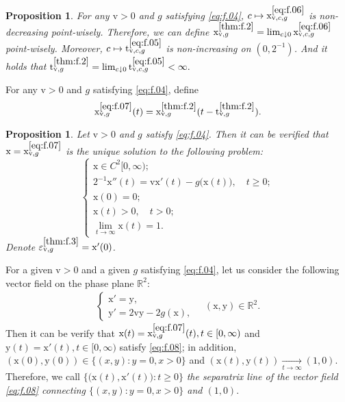 \documentclass[12pt,a4paper]{amsart}
\numberwithin{equation}{section}
\theoremstyle{plain}
\newtheorem{proposition}[theorem]{Proposition}
\theoremstyle{remark}
\begin{document}
\begin{proposition} \label{thm:f.2}
	For any $\mathrm v>0$ and $g$ satisfying \eqref{eq:f.04}, $c \mapsto \mathrm x_{\mathrm v, c,g}^{\eqref{eq:f.06}}$ is non-decreasing point-wisely.
	Therefore, we can define
	$
	\mathrm x_{\mathrm v,g}^{\ref{thm:f.2}} = \lim_{c\downarrow 0} \mathrm x_{\mathrm v,c,g}^{\eqref{eq:f.06}}
	$
	point-wisely.
	Moreover, $c\mapsto \mathrm t_{\mathrm v, c, g}^{\eqref{eq:f.05}}$ is non-increasing on $(0,2^{-1})$.
	And it holds that
	$
	\mathrm t^{\ref{thm:f.2}}_{\mathrm v, g} = \lim_{c\downarrow 0} \mathrm t_{\mathrm v, c , g}^{\eqref{eq:f.05}} < \infty.
	$
\end{proposition}

For any $\mathrm v>0$ and $g$ satisfying \eqref{eq:f.04}, define 
\begin{equation} \label{eq:f.07}
\mathrm x_{\mathrm v, g}^{\eqref{eq:f.07}}(t) = \mathrm x_{\mathrm v, g}^{\ref{thm:f.2}}(t - \mathrm t_{\mathrm v,g}^{\ref{thm:f.2}}).
\end{equation}
\begin{proposition} \label{thm:f.3}
	Let $\mathrm v>0$ and $g$ satisfy \eqref{eq:f.04}. 
	Then it can be verified that $\mathrm x = \mathrm x_{\mathrm v,g}^{\eqref{eq:f.07}}$ is the unique solution to the following problem:
	\begin{equation}
	\begin{cases}
	\mathrm x \in C^2[0,\infty);
	\\ 2^{-1} \mathrm x''(t) = \mathrm v \mathrm x'(t) - g\big(\mathrm x(t)\big), \quad t \geq 0;
	\\ \mathrm x(0) = 0;
	\\ \mathrm x(t) > 0, \quad t > 0;
	\\ \lim_{t\to \infty}\mathrm x(t) = 1.
	\end{cases}
	\end{equation}
	Denote $\varepsilon_{\mathrm v, g}^{\ref{thm:f.3}} = \mathrm x'(0)$.
\end{proposition}

For a given $\mathrm v>0$ and a given $g$ satisfying \eqref{eq:f.04}, let us consider the following vector field on the phase plane $\mathbb R^2$: 
\begin{align} \label{eq:f.08}
\begin{cases}
\mathrm x' = \mathrm y,
\\ \mathrm y' = 2\mathrm v \mathrm y - 2g(\mathrm x),
\end{cases}
\quad (\mathrm x, \mathrm y) \in \mathbb R^2.
\end{align}
Then it can be verify that $\mathrm x(t) = \mathrm x_{\mathrm v, g}^{\ref{eq:f.07}}(t), t \in [0,\infty)$ and $\mathrm y(t) = \mathrm x'(t), t \in [0,\infty)$ satisfy \eqref{eq:f.08}; in addition, $(\mathrm x(0), \mathrm y(0)) \in \{(x,y): y = 0, x>0\}$ and $(\mathrm x(t), \mathrm y(t)) \xrightarrow[t\to \infty]{}(1,0)$. 
Therefore, we call 
$
\big\{\big(\mathrm x (t), \mathrm x'(t)\big): t\geq 0 \big\}
$
\emph{the separatrix line of the vector field \eqref{eq:f.08} connecting $\{(x,y): y = 0, x>0\}$ and $(1,0)$}.
\end{document}
